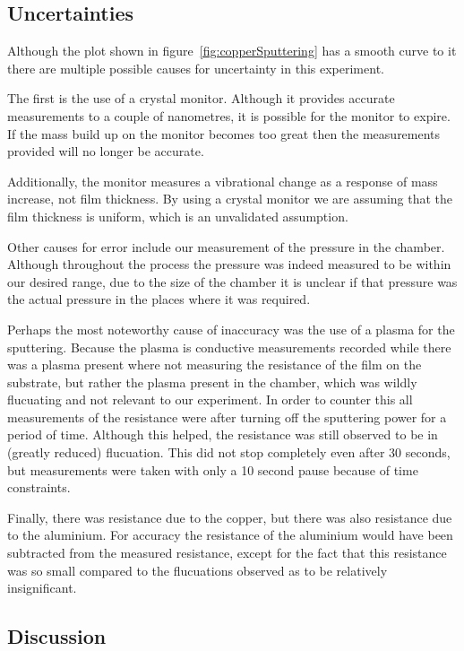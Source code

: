 \documentclass[aps,prl,twocolumn,groupedaddress,showkeys]{revtex4}
\begin{document}
\subsection{Uncertainties}

Although the plot shown in figure~\ref{fig:copperSputtering} has a smooth curve to it there are multiple possible causes for uncertainty in this experiment.

The first is the use of a crystal monitor. Although it provides accurate measurements to a couple of nanometres, it is possible for the monitor to expire. If the mass build up on the monitor becomes too great then the measurements provided will no longer be accurate.

Additionally, the monitor measures a vibrational change as a response of mass increase, not film thickness. By using a crystal monitor we are assuming that the film thickness is uniform, which is an unvalidated assumption.

Other causes for error include our measurement of the pressure in the chamber. Although throughout the process the pressure was indeed measured to be within our desired range, due to the size of the chamber it is unclear if that pressure was the actual pressure in the places where it was required.

Perhaps the most noteworthy cause of inaccuracy was the use of a plasma for the sputtering. Because the plasma is conductive measurements recorded while there was a plasma present where not measuring the resistance of the film on the substrate, but rather the plasma present in the chamber, which was wildly flucuating and not relevant to our experiment. In order to counter this all measurements of the resistance were after turning off the sputtering power for a period of time. Although this helped, the resistance was still observed to be in (greatly reduced) flucuation. This did not stop completely even after 30 seconds, but measurements were taken with only a 10 second pause because of time constraints. 

Finally, there was resistance due to the copper, but there was also resistance due to the aluminium. For accuracy the resistance of the aluminium would have been subtracted from the measured resistance, except for the fact that this resistance was so small compared to the flucuations observed as to be relatively insignificant.

\subsection{Discussion}
\end{document}
